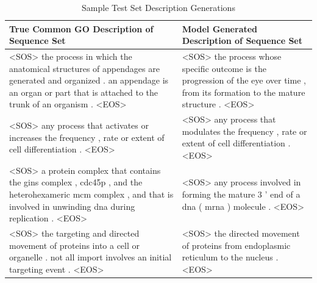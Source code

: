 \documentclass{article}
\begin{document}
\begin{table}
	\caption{Sample Test Set Description Generations}
	\centering
    \begin{tabular}{p{8 cm}|p{8 cm}}
		\toprule
        True Common GO Description of Sequence Set & Model Generated Description of Sequence Set \\
		\midrule
        <SOS> the process in which the anatomical structures of appendages are generated and organized . an appendage is an organ or part that is attached to the trunk of an organism . <EOS> & <SOS> the process whose specific outcome is the progression of the eye over time , from its formation to the mature structure . <EOS> \\ \hline
        <SOS> any process that activates or increases the frequency , rate or extent of cell differentiation . <EOS> & <SOS> any process that modulates the frequency , rate or extent of cell differentiation . <EOS> \\ \hline
		<SOS> a protein complex that contains the gins complex , cdc45p , and the heterohexameric mcm complex , and that is involved in unwinding dna during replication . <EOS> & <SOS> any process involved in forming the mature 3 ' end of a dna ( mrna ) molecule . <EOS> \\
        \hline
        <SOS> the targeting and directed movement of proteins into a cell or organelle . not all import involves an initial targeting event . <EOS> & <SOS> the directed movement of proteins from endoplasmic reticulum to the nucleus . <EOS>  \\
		\bottomrule
	\end{tabular}
    \label{tab:descriptions}
\end{table}
\end{document}
